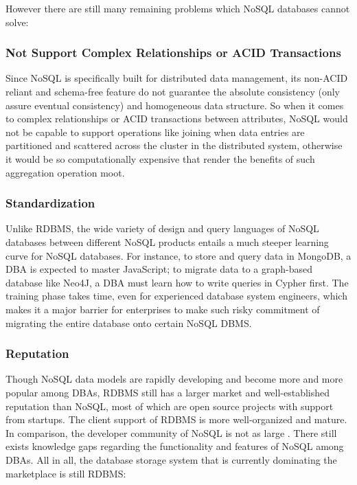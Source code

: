 However there are still many remaining problems which NoSQL
databases cannot solve:

\subsubsection{Not Support Complex  Relationships or ACID Transactions}\mbox{}

\noindent Since NoSQL is specifically built for distributed data management, its non-ACID reliant  and schema-free  feature  do not guarantee the absolute consistency (only assure eventual consistency) and homogeneous data structure. So when it comes to complex  relationships or ACID transactions between attributes, NoSQL would not be capable to support operations like joining when data entries are partitioned and scattered across the cluster in the distributed system, otherwise it would be so computationally expensive that render the benefits of such aggregation operation moot.

\subsubsection{Standardization}\mbox{}

\noindent Unlike RDBMS, the wide variety of design and query languages of NoSQL databases between different NoSQL products entails a much steeper learning curve for NoSQL databases. For instance, to store and query data in MongoDB, a DBA is expected to master JavaScript; to migrate data to a graph-based database like Neo4J, a DBA must learn how to write queries in Cypher first. The training phase takes time, even for experienced database system engineers, which makes it a major barrier for enterprises to make such risky commitment of migrating the entire database onto certain NoSQL DBMS.


\subsubsection{Reputation}\mbox{}

\noindent Though NoSQL data
models are rapidly developing and become more and more popular among DBAs, RDBMS still has a larger market and well-established reputation than NoSQL, most of which are open source projects with support from startups. The client support of RDBMS is more well-organized and mature. In comparison, the developer community of NoSQL is not as large \cite{DBLP:journals/corr/abs-1804-00465}. There still exists knowledge gaps regarding the functionality and features of NoSQL among DBAs. All in all, the database storage system that is currently dominating the marketplace is still RDBMS:


